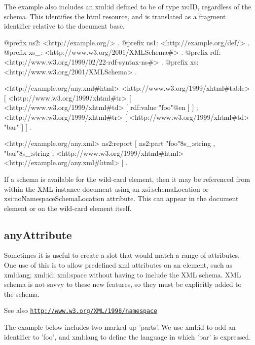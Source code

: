 The example also includes an xml:id defined to be of type xs:ID, regardless of the schema. This identifies the html resource, and is translated as a fragment identifier relative to the document base.


\begin{DoxyCodeInclude}
@prefix ns2:     <http://example.org/> .
@prefix ns1:     <http://example.org/def/> .
@prefix xs_:     <http://www.w3.org/2001/XMLSchema#> .
@prefix rdf:     <http://www.w3.org/1999/02/22-rdf-syntax-ns#> .
@prefix xs:      <http://www.w3.org/2001/XMLSchema> .

<http://example.org/any.xml#html>
      <http://www.w3.org/1999/xhtml#table>
              [ <http://www.w3.org/1999/xhtml#tr>
                        [ <http://www.w3.org/1999/xhtml#td>
                                  [ rdf:value "foo"@en
                                  ]
                        ] ;
                <http://www.w3.org/1999/xhtml#tr>
                        [ <http://www.w3.org/1999/xhtml#td>
                                  "bar"
                        ]
              ] .

<http://example.org/any.xml>
      ns2:report
              [ ns2:part "foo"^^xs_:string , "bar"^^xs_:string ;
                <http://www.w3.org/1999/xhtml#html>
                        <http://example.org/any.xml#html>
              ] .
\end{DoxyCodeInclude}


If a schema is available for the wild-\/card element, then it may be referenced from within the XML instance document using an xsi:schemaLocation or xsi:noNamespaceSchemaLocation attribute. This can appear in the document element or on the wild-\/card element itself. \hypertarget{anyAttribute}{}\subsection{anyAttribute}\label{anyAttribute}
Sometimes it is useful to create a slot that would match a range of attributes. One use of this is to allow predefined xml attributes on an element, such as xml:lang; xml:id; xml:space without having to include the XML schema. XML schema is not savvy to these new features, so they must be explicitly added to the schema.

\begin{DoxySeeAlso}{See also}
\href{http://www.w3.org/XML/1998/namespace}{\tt http://www.w3.org/XML/1998/namespace}
\end{DoxySeeAlso}
The example below includes two marked-\/up 'parts'. We use xml:id to add an identifier to 'foo', and xml:lang to define the language in which 'bar' is expressed.



